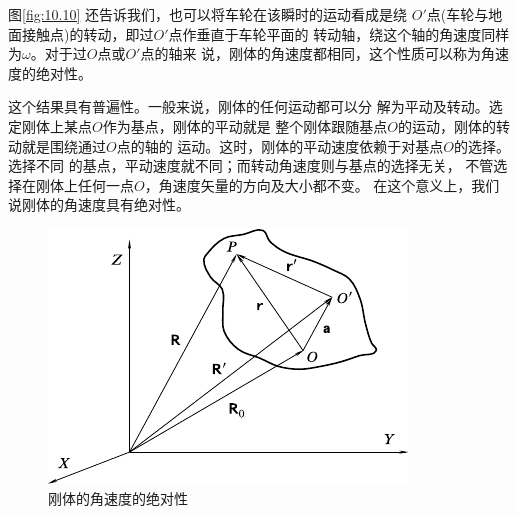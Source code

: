 图\ref{fig:10.10} 还告诉我们，也可以将车轮在该瞬时的运动看成是绕
$ O' $点(车轮与地面接触点)的转动，即过$ O' $点作垂直于车轮平面的
转动轴，绕这个轴的角速度同样为$ \omega $。对于过$ O $点或$ O' $点的轴来
说，刚体的角速度都相同，这个性质可以称为角速度的绝对性。

这个结果具有普遍性。一般来说，刚体的任何运动都可以分
解为平动及转动。选定刚体上某点$ O $作为基点，刚体的平动就是
整个刚体跟随基点$ O $的运动，刚体的转动就是围绕通过$ O $点的轴的
运动。这时，刚体的平动速度依赖于对基点$ O $的选择。选择不同
的基点，平动速度就不同；而转动角速度则与基点的选择无关，
不管选择在刚体上任何一点$ O $，角速度矢量的方向及大小都不变。
在这个意义上，我们说刚体的角速度具有绝对性。

\begin{figure}[h]
  \centering
  \includegraphics{figure/fig10.11}
  \caption{刚体的角速度的绝对性}
  \label{fig:10.11}
\end{figure}

